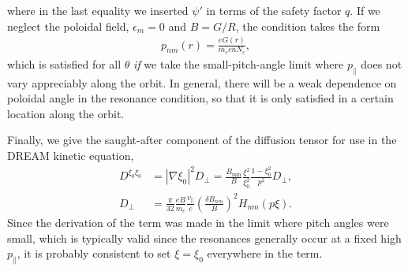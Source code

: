 \documentclass[11pt,a4paper]{article}
\newcommand{\sub}[1]{\ensuremath{_{\text{#1}}}}
\begin{document}
where in the last equality we inserted $\psi'$ in terms of the safety factor $q$.
If we neglect the poloidal field, $\epsilon_m=0$ and $B=G/R$, the condition takes the form
\begin{align}
p_{nm}(r) = \frac{e G(r)}{m_e c n N_c},
\end{align}
which is satisfied for all $\theta$ \emph{if} we take the small-pitch-angle limit where $p_\parallel$ does not vary appreciably along the orbit. In general, there will be a weak dependence on poloidal angle in the resonance condition, so that it is only satisfied in a certain location along the orbit.

Finally, we give the saught-after component of the diffusion tensor for use in the DREAM kinetic equation,
\begin{align}
D^{\xi_0 \xi_0} &= |\nabla \xi_0|^2 D_\perp = \frac{B\sub{min}}{B}\frac{\xi^2}{\xi_0^2} \frac{1-\xi_0^2}{p^2} D_\perp, \nonumber \\
D_\perp &= \frac{\pi}{32}\frac{ eB}{m_e}\frac{v_\parallel}{c} \left(\frac{\delta B_{nm}}{B}\right)^2 H_{nm}(p\xi).
\end{align}
Since the derivation of the term was made in the limit where pitch angles were small, which is typically valid since the resonances generally occur at a fixed high $p_\parallel$, it is probably consistent to set $\xi=\xi_0$ everywhere in the term.
\end{document}
